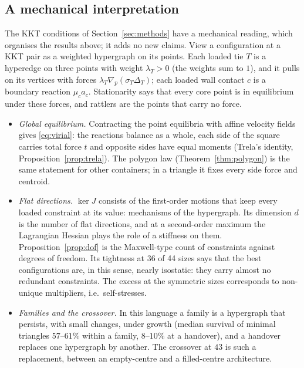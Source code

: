 \documentclass[11pt]{amsart}
\theoremstyle{definition}
\begin{document}
\subsection{A mechanical interpretation}\label{sec:mech}
The KKT conditions of Section~\ref{sec:methods} have a mechanical reading, which organises the results above; it adds no new claims. View a configuration at a KKT pair as a weighted hypergraph on its points. Each loaded tie $T$ is a hyperedge on three points with weight $\lambda_T > 0$ (the weights sum to $1$), and it pulls on its vertices with forces $\lambda_T\nabla_{p}(\sigma_T\Delta_T)$; each loaded wall contact $c$ is a boundary reaction $\mu_c a_c$. Stationarity says that every core point is in equilibrium under these forces, and rattlers are the points that carry no force.
\begin{itemize}
\item \emph{Global equilibrium.} Contracting the point equilibria with affine velocity fields gives \eqref{eq:virial}: the reactions balance as a whole, each side of the square carries total force $t$ and opposite sides have equal moments (Trela's identity, Proposition~\ref{prop:trela}). The polygon law (Theorem~\ref{thm:polygon}) is the same statement for other containers; in a triangle it fixes every side force and centroid.
\item \emph{Flat directions.} $\ker J$ consists of the first-order motions that keep every loaded constraint at its value: mechanisms of the hypergraph. Its dimension $d$ is the number of flat directions, and at a second-order maximum the Lagrangian Hessian plays the role of a stiffness on them. Proposition~\ref{prop:dof} is the Maxwell-type count of constraints against degrees of freedom. Its tightness at 36 of 44 sizes says that the best configurations are, in this sense, nearly isostatic: they carry almost no redundant constraints. The excess at the symmetric sizes corresponds to non-unique multipliers, i.e.\ self-stresses.
\item \emph{Families and the crossover.} In this language a family is a hypergraph that persists, with small changes, under growth (median survival of minimal triangles $57$--$61\%$ within a family, $8$--$10\%$ at a handover), and a handover replaces one hypergraph by another. The crossover at $43$ is such a replacement, between an empty-centre and a filled-centre architecture.
\end{itemize}
\end{document}
